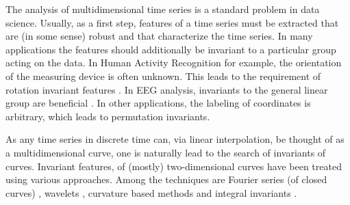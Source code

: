 \documentclass{scrartcl}
\theoremstyle{plain}
\theoremstyle{definition}
\newcommand{\1}[1]{1_{\{#1\}}}
\let\todon\todo
\newcommand{\todonotes}[1]{\todon{\color{red}#1}}
\renewcommand{\todo}[1]{ \textbf{\color{Orange}(#1)} }
\begin{document}

The analysis of multidimensional time series is a standard problem in data science.
Usually, as a first step, features of a time series must be extracted that are
(in some sense) robust and that characterize the time series.
%
%
In many applications the features should additionally be invariant to a particular group
acting on the data.
%
In Human Activity Recognition for example,
the orientation of the measuring device is often unknown.
This leads to the requirement of rotation invariant features \cite{bib:MA2017}.
%
In EEG analysis, invariants to the general linear group are beneficial \cite{bib:EMZMN2012}.
%
In other applications, the labeling of coordinates is arbitrary, which leads to
permutation invariants.


As any time series in discrete time can, via linear interpolation, be thought of as a multidimensional curve,
one is naturally lead to the search of invariants of curves.
%
Invariant features, of (mostly) two-dimensional curves
have been treated using various approaches.
%
Among the techniques are
Fourier series (of closed curves) \cite{bibGranlund1972,bibZahnRoskies1972,bibKuhlGiardina1982},
wavelets \cite{bibChuangKuo1996},
curvature based methods \cite{bibMokhtarianMackworth1986,bib:COSTH1998} %
and integral invariants \cite{bibManayCremers2006,bib:FKK2010}.
\end{document}

